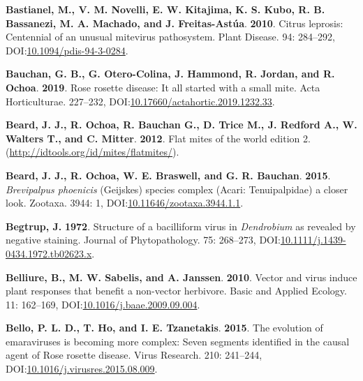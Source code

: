 \documentclass[12pt,final,CPage]{ufthesis}
\newlength{\cslhangindent}
\newenvironment{CSLReferences}[2] %
{%
	\setlength{\parindent}{0pt}
	\ifodd #1 \everypar{\setlength{\hangindent}{\cslhangindent}}\ignorespaces\fi
	\ifnum #2 > 0
	\setlength{\parskip}{#2\baselineskip}
	\fi
}%
{}
\begin{document}
{\begin{CSLReferences}{1}{0}
  \leavevmode{}%
  \textbf{Bastianel, M., V. M. Novelli, E. W. Kitajima, K. S. Kubo, R. B. Bassanezi, M. A. Machado, and J. Freitas-Astúa}. \textbf{2010}. {Citrus leprosis}: Centennial of an unusual mite{\textendash}virus pathosystem. Plant Disease. 94: 284--292, DOI:\href{https://doi.org/10.1094/pdis-94-3-0284}{10.1094/pdis-94-3-0284}.

  \leavevmode{}%
  \textbf{Bauchan, G. B., G. Otero-Colina, J. Hammond, R. Jordan, and R. Ochoa}. \textbf{2019}. {Rose rosette disease}: It all started with a small mite. Acta Horticulturae. 227--232, DOI:\href{https://doi.org/10.17660/actahortic.2019.1232.33}{10.17660/actahortic.2019.1232.33}.

  \leavevmode{}%
  \textbf{Beard, J. J., R. Ochoa, R. Bauchan G., D. Trice M., J. Redford A., W. Walters T., and C. Mitter}. \textbf{2012}. Flat mites of the world edition 2. (\url{http://idtools.org/id/mites/flatmites/}).

  \leavevmode{}%
  \textbf{Beard, J. J., R. Ochoa, W. E. Braswell, and G. R. Bauchan}. \textbf{2015}. {\emph{Brevipalpus phoenicis}} {(Geijskes)} species complex ({Acari}: {Tenuipalpidae}) \textemdash a closer look. Zootaxa. 3944: 1, DOI:\href{https://doi.org/10.11646/zootaxa.3944.1.1}{10.11646/zootaxa.3944.1.1}.

  \leavevmode{}%
  \textbf{Begtrup, J.} \textbf{1972}. Structure of a bacilliform virus in {\emph{Dendrobium}} as revealed by negative staining. Journal of Phytopathology. 75: 268--273, DOI:\href{https://doi.org/10.1111/j.1439-0434.1972.tb02623.x}{10.1111/j.1439-0434.1972.tb02623.x}.

  \leavevmode{}%
  \textbf{Belliure, B., M. W. Sabelis, and A. Janssen}. \textbf{2010}. Vector and virus induce plant responses that benefit a non-vector herbivore. Basic and Applied Ecology. 11: 162--169, DOI:\href{https://doi.org/10.1016/j.baae.2009.09.004}{10.1016/j.baae.2009.09.004}.

  \leavevmode{}%
  \textbf{Bello, P. L. D., T. Ho, and I. E. Tzanetakis}. \textbf{2015}. The evolution of emaraviruses is becoming more complex: Seven segments identified in the causal agent of {Rose rosette disease}. Virus Research. 210: 241--244, DOI:\href{https://doi.org/10.1016/j.virusres.2015.08.009}{10.1016/j.virusres.2015.08.009}.


\end{CSLReferences}}
\end{document}

